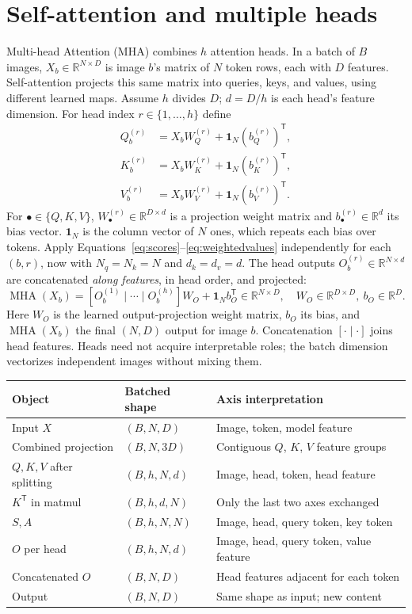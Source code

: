 \documentclass[11pt,a4paper,oneside]{report}
\newcommand{\R}{\mathbb{R}}
\newcommand{\MHA}{\operatorname{MHA}}
\begin{document}
\newpage
\section{Self-attention and multiple heads}
Multi-head Attention (MHA) combines $h$ attention heads. In a batch of $B$
images, $X_b\in\R^{N\times D}$ is image $b$'s matrix of $N$ token rows,
each with $D$ features. Self-attention projects this same matrix into queries,
keys, and values, using different learned maps. Assume $h$ divides $D$;
$d=D/h$ is each head's feature dimension. For head index
$r\in\{1,\ldots,h\}$ define
\begin{align}
 Q_b^{(r)}&=X_bW_Q^{(r)}+\mathbf1_N(b_Q^{(r)})^{\mathsf T},\\
 K_b^{(r)}&=X_bW_K^{(r)}+\mathbf1_N(b_K^{(r)})^{\mathsf T},\\
 V_b^{(r)}&=X_bW_V^{(r)}+\mathbf1_N(b_V^{(r)})^{\mathsf T}.
\end{align}
For $\bullet\in\{Q,K,V\}$, $W_\bullet^{(r)}\in\R^{D\times d}$ is a
projection weight matrix and $b_\bullet^{(r)}\in\R^d$ its bias vector.
$\mathbf1_N$ is the column vector of $N$ ones, which repeats each bias over
tokens. Apply Equations~\eqref{eq:scores}--\eqref{eq:weightedvalues}
independently for each $(b,r)$, now with $N_q=N_k=N$ and $d_k=d_v=d$.
The head outputs $O_b^{(r)}\in\R^{N\times d}$ are concatenated
\emph{along features}, in head order, and projected:
\begin{equation}
 \MHA(X_b)=
 [O_b^{(1)}\mid\cdots\mid O_b^{(h)}]W_O
 +\mathbf1_N b_O^{\mathsf T}\in\R^{N\times D},
 \quad W_O\in\R^{D\times D},\ b_O\in\R^D.
\end{equation}
Here $W_O$ is the learned output-projection weight matrix, $b_O$ its bias,
and $\MHA(X_b)$ the final $(N,D)$ output for image $b$. Concatenation
$[\cdot\mid\cdot]$ joins head features. Heads need not acquire interpretable
roles; the batch dimension vectorizes independent images without mixing them.

\begin{center}
\begin{tabularx}{\textwidth}{@{}l l Y@{}}
\toprule
Object & Batched shape & Axis interpretation\\\midrule
Input $X$ & $(B,N,D)$ & Image, token, model feature\\
Combined projection & $(B,N,3D)$ & Contiguous $Q$, $K$, $V$ feature groups\\
$Q,K,V$ after splitting & $(B,h,N,d)$ & Image, head, token, head feature\\
$K^{\mathsf T}$ in matmul & $(B,h,d,N)$ & Only the last two axes exchanged\\
$S,A$ & $(B,h,N,N)$ & Image, head, query token, key token\\
$O$ per head & $(B,h,N,d)$ & Image, head, query token, value feature\\
Concatenated $O$ & $(B,N,D)$ & Head features adjacent for each token\\
Output & $(B,N,D)$ & Same shape as input; new content\\
\bottomrule
\end{tabularx}
\end{center}
\end{document}

